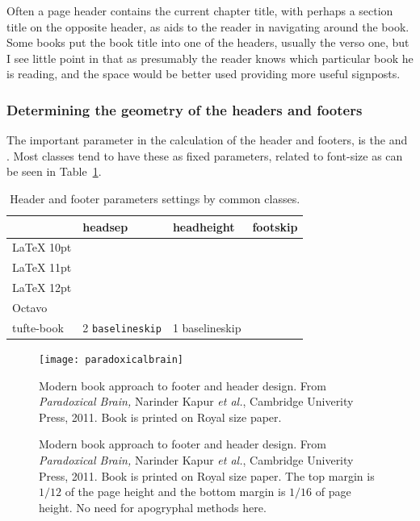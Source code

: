 Often a page header contains the current chapter title, with perhaps a section title on
the opposite header, as aids to the reader in navigating around the book. Some books put
the book title into one of the headers, usually the verso one, but I see little point in that as
presumably the reader knows which particular book he is reading, and the space would
be better used providing more useful signposts.

\subsubsection{Determining the geometry of the headers and footers}

The important parameter in the calculation of the header and footers, is the  and . Most classes tend to have these as fixed parameters, related to font-size as can be seen in Table~\ref{tab:headerparams}.

\begin{table}[htbp]
\centering
\caption{Header and footer parameters settings by common classes.}
\label{tab:headerparams}
\begin{tabular}{llll}
\toprule
                    &headsep                   &headheight &footskip\\
\midrule
LaTeX 10pt    &             &                 &           \\
LaTeX 11pt    &             &                 &           \\
LaTeX 12pt    &             &                 &           \\
Octavo          &             &                 &           \\
tufte-book     &2 \texttt{baselineskip}   & 1 baselineskip           &            \\
\bottomrule
\end{tabular}
\end{table}

\begin{figure}[htbp]
\texttt{[image: paradoxicalbrain]}
\caption{Modern book approach to footer and header design. From \textit{Paradoxical Brain,} Narinder Kapur \textit{et al.}, Cambridge Univerity Press, 2011. Book is printed on Royal size paper.}
\label{fig:paradoxical}
\end{figure}

\begin{figure}[htbp]
{{\parindent0pt
}}
\caption{Modern book approach to footer and header design. From \textit{Paradoxical Brain,} Narinder Kapur \textit{et al.}, Cambridge Univerity Press, 2011. Book is printed on Royal size paper. The top margin is $1/12$ of the page height and the bottom margin is $1/16$ of page height. No need for apogryphal methods here.}
\label{fig:paradoxical}
\end{figure}

